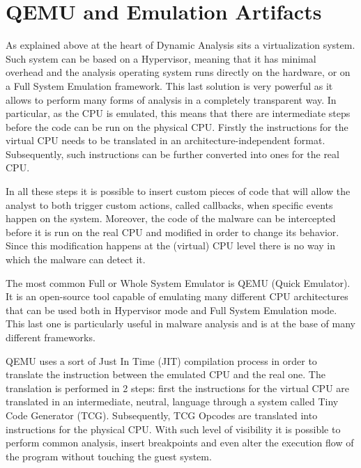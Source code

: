 \section{QEMU and Emulation Artifacts}

As explained above at the heart of Dynamic Analysis sits a virtualization system. Such system can be based on a Hypervisor, meaning that it has minimal overhead and the analysis operating system runs directly on the hardware, or on a Full System Emulation framework. This last solution is very powerful as it allows to perform many forms of analysis in a completely transparent way. In particular, as the CPU is emulated, this means that there are intermediate steps before the code can be run on the physical CPU. Firstly the instructions for the virtual CPU needs to be translated in an architecture-independent format. Subsequently, such instructions can be further converted into ones for the real CPU. 

In all these steps it is possible to insert custom pieces of code that will allow the analyst to both trigger custom actions, called callbacks, when specific events happen on the system. Moreover, the code of the malware can be intercepted before it is run on the real CPU and modified in order to change its behavior. Since this modification happens at the (virtual) CPU level there is no way in which the malware can detect it.

The most common Full or Whole System Emulator is QEMU (Quick Emulator). It is an open-source tool capable of emulating many different CPU architectures that can be used both in Hypervisor mode and Full System Emulation mode. This last one is particularly useful in malware analysis and is at the base of many different frameworks.  

QEMU uses a sort of Just In Time (JIT) compilation process in order to translate the instruction between the emulated CPU and the real one. The translation is performed in 2 steps: first the instructions for the virtual CPU are translated in an intermediate, neutral, language through a system called Tiny Code Generator (TCG). Subsequently, TCG Opcodes are translated into instructions for the physical CPU. With such level of visibility it is possible to perform common analysis, insert breakpoints and even alter the execution flow of the program without touching the guest system. 

